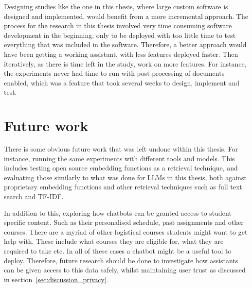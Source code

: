 Designing studies like the one in this thesis, where large custom software is designed and implemented, would benefit from a more incremental approach. The process for the research in this thesis involved very time consuming software development in the beginning, only to be deployed with too little time to test everything that was included in the software. Therefore, a better approach would have been getting a working assistant, with less features deployed faster. Then iteratively, as there is time left in the study, work on more features. For instance, the experiments never had time to run with post processing of documents enabled, which was a feature that took several weeks to design, implement and test.






\section{Future work}
\label{sec:futureWork}








There is some obvious future work that was left undone within this thesis. For instance, running the same experiments with different tools and models. This includes testing open source embedding functions as a retrieval technique, and evaluating those similarly to what was done for \gls{LLMs} in this thesis, both against proprietary embedding functions and other retrieval techniques such as full text search and \gls{TF-IDF}.


In addition to this, exploring how chatbots can be granted access to student specific content. Such as their personalised schedule, past assignments and other courses. There are a myriad of other logistical courses students might want to get help with. These include what courses they are eligible for, what they are required to take etc. In all of these cases a chatbot might be a useful tool to deploy. Therefore, future research should be done to investigate how assistants can be given access to this data safely, whilst maintaining user trust as discussed in section~\ref{sec:discussion_privacy}.


